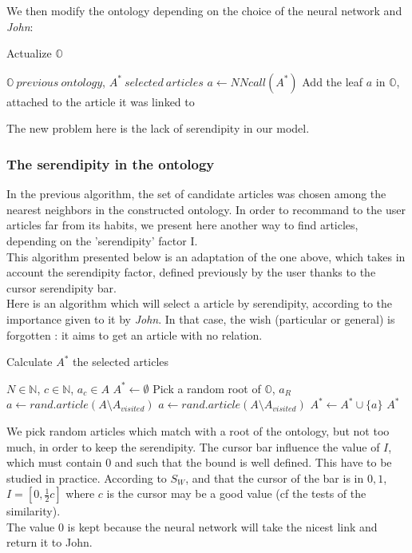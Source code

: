 \documentclass[11pt]{article}
\theoremstyle{plain}
\theoremstyle{definition}
\theoremstyle{remark}
\begin{document}
We then modify the ontology depending on the choice of the neural network and \textit{John}: 

\begin{algorithm}
	\caption{Actualize $\mathbb{O}$}
	\begin{algorithmic}
		\REQUIRE $\mathbb{O} \: previous \: ontology$, $A^* \: selected \: articles$
		\STATE $a\leftarrow NNcall(A^*)$
		\STATE Add the leaf $a$ in $\mathbb{O}$, attached to the article it was linked to
	\end{algorithmic}
\end{algorithm}
		
The new problem here is the lack of serendipity in our model. 

\subsubsection{The serendipity in the ontology}

In the previous algorithm, the set of candidate articles was chosen among the nearest neighbors in the constructed ontology.
In order to recommand to the user articles far from its habits, we present here another way to find articles, depending on the 'serendipity' factor I.\\
This algorithm presented below is an adaptation of the one above, which takes in account the serendipity factor, defined previously by the user thanks to the cursor serendipity bar. \\
Here is an algorithm which will select a article by serendipity, according to the importance given to it by \textit{John}. In that case, the wish (particular or general) is forgotten : it aims to get an article with no relation. 

\begin{algorithm}
  \caption{Calculate $A^*$ the selected articles}
  \begin{algorithmic}
    \REQUIRE $N \in \mathbb{N}$, $c \in \mathbb{N}$, $a_c\in A$
    \STATE $A^* \leftarrow \emptyset$
    \STATE Pick a random root of $\mathbb{O}$, $a_R$
    \STATE $a \leftarrow rand.article(A\setminus A_{visited})$
    \STATE $a 
    \leftarrow rand.article(A\setminus A_{visited})$
    \ENDWHILE
    \STATE $ A^* \leftarrow A^* \cup {\{a}\}$
    \ENDWHILE
    \RETURN $A^*$
  \end{algorithmic}
\end{algorithm}

We pick random articles which match with a root of the ontology, but not too much, in order to keep the serendipity. The cursor bar influence the value of $I$, which must contain $0$ and such that the bound is well defined. This have to be studied in practice. According to $S_W$, and that the cursor of the bar is in $0,1$, $I=[0,\frac{1}{2}c]$ where $c$ is the cursor may be a good value (cf the tests of the similarity).\\
The value $0$ is kept because the neural network will take the nicest link and return it to John.\\\\
\end{document}
